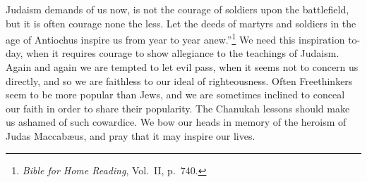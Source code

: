 Judaism demands of us now, is not the
courage of soldiers upon the battlefield, but
it is often courage none the less. Let the
deeds of martyrs and soldiers in the age of
Antiochus inspire us from year to year
anew.”\footnote{\textsl{Bible for Home Reading},
Vol.\ II, p.\ 740.}
We need this inspiration to-day,
when it requires courage to show allegiance
to the teachings of Judaism. Again and again
we are tempted to let evil pass, when it
seems not to concern us directly, and so we
are faithless to our ideal of righteousness.
Often Freethinkers seem to be more popular
than Jews, and we are sometimes inclined
to conceal our faith in order to share their
popularity. The Chanukah lessons should
make us ashamed of such cowardice. We
bow our heads in memory of the heroism of
Judas Maccabæus, and pray that it may
inspire our lives.

